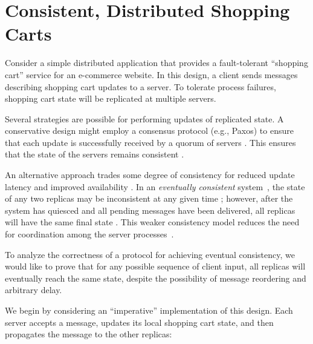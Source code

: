 \section{Consistent, Distributed Shopping Carts}
\label{sec:motivation}

Consider a simple distributed application that provides a fault-tolerant
``shopping cart'' service for an e-commerce website. In this design, a client
sends messages describing shopping cart updates to a server.
To tolerate process failures, shopping cart state will be replicated
at multiple servers.

Several strategies are possible for performing updates of replicated state. A
conservative design might employ a consensus protocol (e.g., Paxos\cite{part-time})
to ensure that each update is successfully received by a quorum of servers . This
ensures that the state of the servers remains consistent .

An alternative approach trades some degree of consistency for reduced update
latency and improved availability . In an \emph{eventually consistent}
system~\cite{quicksand,beyond}, the state of any two replicas may be
inconsistent at any given time ; however, after the system has quiesced and all
pending messages have been delivered, all replicas will have the same final
state . This weaker consistency model reduces the need for coordination among the server processes~\cite{dynamo}.

To analyze the correctness of a protocol for achieving eventual consistency, we
would like to prove that for any possible sequence of client input, all
replicas will eventually reach the same state, despite the possibility of
message reordering and arbitrary delay.

We begin by considering an ``imperative''  implementation of this design. Each
server accepts a message, updates its local shopping cart state, and
then propagates the message to the other replicas:

